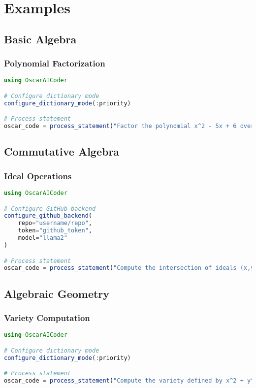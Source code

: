\documentclass[11pt,a4paper]{article}
\begin{document}
\section{Examples}

\subsection{Basic Algebra}

\subsubsection{Polynomial Factorization}

\begin{lstlisting}[language=Julia]
using OscarAICoder

# Configure dictionary mode
configure_dictionary_mode(:priority)

# Process statement
oscar_code = process_statement("Factor the polynomial x^2 - 5x + 6 over the integers")
\end{lstlisting}

\subsection{Commutative Algebra}

\subsubsection{Ideal Operations}

\begin{lstlisting}[language=Julia]
using OscarAICoder

# Configure GitHub backend
configure_github_backend(
    repo="username/repo",
    token="github_token",
    model="llama2"
)

# Process statement
oscar_code = process_statement("Compute the intersection of ideals (x,y) and (y,z) in Q[x,y,z]")
\end{lstlisting}

\subsection{Algebraic Geometry}

\subsubsection{Variety Computation}

\begin{lstlisting}[language=Julia]
using OscarAICoder

# Configure dictionary mode
configure_dictionary_mode(:priority)

# Process statement
oscar_code = process_statement("Compute the variety defined by x^2 + y^2 - 1 in Q[x,y]")
\end{lstlisting}
\end{document}
